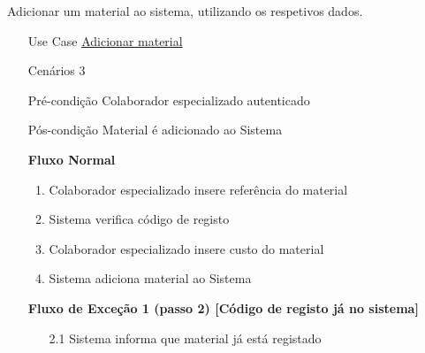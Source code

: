 \documentclass[../relatorio.tex]{subfiles}
\begin{document}
Adicionar um material ao sistema, utilizando os respetivos dados.
\begin{itemize}
    \item[Use Case] {\underline{Adicionar material}}
    \item[Cenários] {3}
    \item[Pré-condição] {Colaborador especializado autenticado}
    \item[Pós-condição] {Material é adicionado ao Sistema}
          \begin{flushleft}
              \textbf{Fluxo Normal}
          \end{flushleft}
          \begin{enumerate}
              \item Colaborador especializado insere referência do material %
              \item Sistema verifica código de registo                      %
              \item Colaborador especializado insere custo do material      %
              \item Sistema adiciona material ao Sistema                    %
          \end{enumerate}
          \begin{flushleft}
              \textbf{Fluxo de Exceção 1 (passo 2) [Código de registo já no sistema]}
          \end{flushleft}
          \begin{itemize}
              \item[2.1] Sistema informa que material já está registado     %
          \end{itemize}
\end{itemize}
\end{document}
